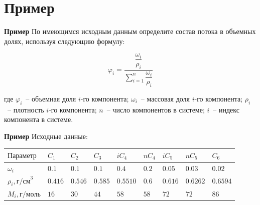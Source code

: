 \documentclass[aspectratio=169, mathserif]{beamer}%
\begin{document}
\section{Пример}
\sectionframe

\begin{frame}[fragile]{\space}
\scriptsize
\begin{alertblock}{\textbf{Пример}}
По имеющимся исходным данным определите состав потока в объемных долях, используя следующию формулу:
\end{alertblock}
\vfill
\begin{large}
\begin{equation*}
		\varphi _i = \dfrac{\dfrac{\omega _i}{\rho _i}}{\sum \limits _{i=1}^{n} \dfrac{\omega _i}{\rho _i}} 
\end{equation*}
\end{large}
\vfill
где $\varphi _i$~-- объемная доля $i$-го компонента; $\omega _i$~-- массовая доля $i$-го компонента; $\rho _i$~-- плотность $i$-го компонента; $n$~-- число компонентов в системе; $i$~-- индекс компонента в системе.
\vfill
\end{frame}

\begin{frame}[fragile]{\space}
\scriptsize
\begin{alertblock}{\textbf{Пример}}
Исходные данные:
\end{alertblock}
\begin{table}[h!]
	\begin{tabular}{|p{.2\linewidth}|p{.05\linewidth}|p{.05\linewidth}|p{.05\linewidth}|p{.05\linewidth}|p{.05\linewidth}|p{.05\linewidth}|p{.05\linewidth}|p{.05\linewidth}|}
		\hline
		$\mathrm{Параметр}$ & $C_1$ & $C_2$ & $C_3$ & $iC_4$ & $nC_4$ & $iC_5$ & $nC_5$ & $C_6$ \\
		\hline
		$\omega _i$ & $0.1$ & $0.1$ & $0.1$ & $0.4$ & $0.2$ & $0.05$ & $0.03$ & $0.02$ \\
		\hline
		$\rho_i, \mathrm{г/см}^3$ & $0.416$ & $0.546$ & $0.585$ & $0.5510$ & $0.6$ & $0.616$ & $0.6262$ & $0.6594$\\
		\hline
		$M_i, \mathrm{г/моль}$ & $16$ & $30$ & $44$ & $58$ & $58$ & $72$ & $72$ & $86$ \\
		\hline
	\end{tabular}
\end{table}
\vfill
\end{frame}
\end{document}
